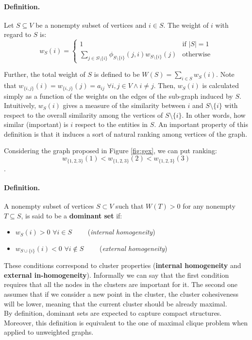\paragraph{Definition.} Let $S\subseteq V$ be a nonempty subset of vertices and $i \in S$. The weight of $i$ with regard to $S$ is:
\begin{equation}
  w_S(i)= \begin{cases}
      1 & \text{if } |S| = 1 \\
      \sum\limits_{j\in S\setminus \{i\}}\phi_{S\setminus \{i\}}(j, i)w_{S\setminus \{i\}}(j) & \text{otherwise}
  \end{cases}
\end{equation}

Further, the total weight of $S$ is defined to be $W(S)=\sum_{i\in S}w_S(i)$.
Note that $w_{\{i, j\}}(i)=w_{\{i, j\}}(j)=a_{ij}$ $\forall i, j \in V \land i\neq j$. Then, $w_S(i)$ is calculated simply as a function of the weights on the edges of the sub-graph induced by $S$.\\

Intuitively, $w_S(i)$ gives a measure of the similarity between $i$ and $S\setminus \{i\}$ with respect to the overall similarity among the vertices of $S\setminus \{i\}$. In other words, how similar (important) is $i$ respect to the entities in $S$.
An important property of this definition is that it induces a sort of natural ranking among vertices of the graph. 



Considering the graph proposed in Figure \ref{fig:gex}, we can put ranking: $$w_{\{1,2,3\}}(1) < w_{\{1,2,3\}}(2) < w_{\{1,2,3\}}(3)$$.

\paragraph{Definition.} A nonempty subset of vertices $S\subset V$ such that $W(T)>0$ for any nonempty $T \subseteq S$, is said to be a \textbf{dominant set} if:
\begin{itemize}
  \item $w_S(i) > 0$ $\forall i \in S \qquad$ (\textit{internal homogeneity})
  \item $w_{S \cup \{i\}}(i) < 0$ $\forall i \notin S \qquad$ (\textit{external homogeneity})
\end{itemize}
These conditions correspond to cluster properties (\textbf{internal homogeneity} and \textbf{external in-homogeneity}). Informally we can say that the first condition requires that all the nodes in the clusters are important for it. The second one assumes that if we consider a new point in the cluster, the cluster cohesiveness will be lower, meaning that the current cluster should be already maximal.\\
By definition, dominant sets are expected to capture compact structures. Moreover, this definition is equivalent to the one of maximal clique problem when applied to unweighted graphs.


